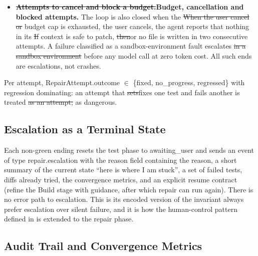 \documentclass[pdflatex,sn-mathphys-num]{sn-jnl}%
\newcommand{\fix}[1]{{\color{fixcol}#1}}
\newcommand{\fixdel}[1]{{\color{fixcol}\sout{#1}}}
\newcommand{\rw}[2]{{\color{rwcol}#1}}%
\theoremstyle{thmstyleone}%
\theoremstyle{thmstyletwo}%
\theoremstyle{thmstylethree}%
\begin{document}
\begin{itemize}
\item \rw{\textbf{\fixdel{Attempts to cancel and block a budget.}\fix{Budget, cancellation and blocked attempts.}} The loop is also closed when the \fixdel{When the user cancel or} budget cap is exhausted, \fix{the user cancels,} the agent reports that nothing in its \fixdel{If} context is safe to patch, \fixdel{then}\fix{or} no file is written in two consecutive attempts. A failure classified as a \fix{sandbox-environment} fault escalates \fixdel{in a sandbox environment} before any model call at zero token cost. All such ends are escalations, not crashes.}{\textbf{Budget, cancellation and blocked attempts.} The loop also ends when the budget cap is exhausted, the user cancels, the agent reports that nothing in its context is safe to patch, or two consecutive attempts write no file. A failure classified as a sandbox-environment fault escalates before any model call, at zero token cost. Every such ending is an escalation, never a crash.}
\end{itemize}

\rw{Per attempt, RepairAttempt.outcome $\in$ \{fixed, no\_progress, regressed\} with regression dominating: an attempt that \fixdel{sets}\fix{fixes} one test and fails another is treated \fixdel{as an attempt;} as dangerous.}{Per attempt, RepairAttempt.outcome $\in$ \{fixed, no\_progress, regressed\} with regression dominating: an attempt that fixes one test and breaks another is still treated as dangerous.}

\subsection{Escalation as a Terminal State}\label{sec5.4}

Each non-green ending resets the test phase to awaiting\_user and sends an event of type repair.escalation with the reason field containing the reason, a short summary of the current state ``here is where I am stuck'', a set of failed tests, diffs already tried, the convergence metrics, and an explicit resume contract (refine the Build stage with guidance, after which repair can run again). There is no error path to escalation. This is its encoded version of the invariant always prefer escalation over silent failure, and it is how the human-control pattern defined in \cite{r21takerngsaksiri} is extended to the repair phase.

\subsection{Audit Trail and Convergence Metrics}\label{sec5.5}
\end{document}
